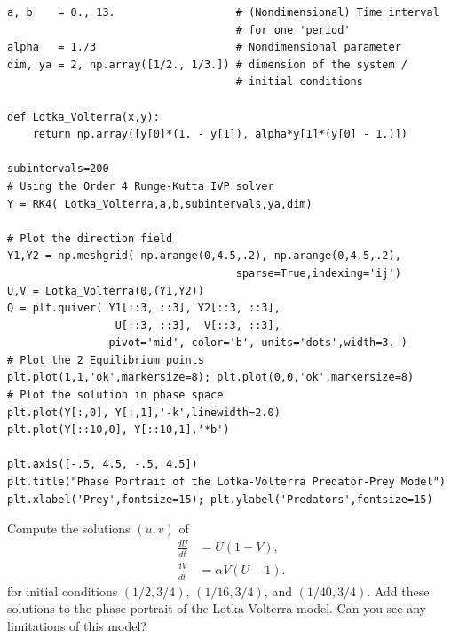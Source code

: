 \begin{lstlisting}
a, b 	= 0., 13. 					# (Nondimensional) Time interval 
									# for one 'period' 
alpha 	= 1./3              		# Nondimensional parameter
dim, ya = 2, np.array([1/2., 1/3.]) # dimension of the system / 
									# initial conditions

def Lotka_Volterra(x,y):
	return np.array([y[0]*(1. - y[1]), alpha*y[1]*(y[0] - 1.)])

subintervals=200
# Using the Order 4 Runge-Kutta IVP solver
Y = RK4( Lotka_Volterra,a,b,subintervals,ya,dim)

# Plot the direction field
Y1,Y2 = np.meshgrid( np.arange(0,4.5,.2), np.arange(0,4.5,.2),
									sparse=True,indexing='ij')
U,V = Lotka_Volterra(0,(Y1,Y2))
Q = plt.quiver( Y1[::3, ::3], Y2[::3, ::3], 
				 U[::3, ::3],  V[::3, ::3],
            	pivot='mid', color='b', units='dots',width=3. )
# Plot the 2 Equilibrium points
plt.plot(1,1,'ok',markersize=8); plt.plot(0,0,'ok',markersize=8) 
# Plot the solution in phase space
plt.plot(Y[:,0], Y[:,1],'-k',linewidth=2.0)
plt.plot(Y[::10,0], Y[::10,1],'*b')

plt.axis([-.5, 4.5, -.5, 4.5])
plt.title("Phase Portrait of the Lotka-Volterra Predator-Prey Model")
plt.xlabel('Prey',fontsize=15); plt.ylabel('Predators',fontsize=15)
\end{lstlisting}


\begin{problem}
	Compute the solutions $(u,v)$ of 
	\begin{align*}
		\frac{dU}{d\bar{t}} &= U(1-V),\\
		\frac{dV}{d\bar{t}} &= \alpha V (U-1).
	\end{align*}
	for initial conditions $(1/2, 3/4)$, $(1/16, 3/4)$, and $(1/40, 3/4)$.
	Add these solutions to the phase portrait of the Lotka-Volterra model.
	Can you see any limitations of this model? 
\end{problem}





